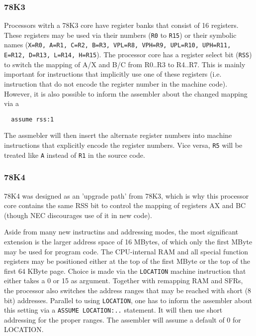 \documentclass[12pt,twoside]{report}
\newcommand{\tty}[1]{{\tt #1}}
\begin{document}

\subsubsection{78K3}

Processors witrh a 78K3 core have register banks that consist of
16 registers.  These registers may be used via their numbers
(\tty{R0} to \tty{R15}) or their symbolic names (\tty{X=R0, A=R1,
C=R2, B=R3, VPL=R8, VPH=R9, UPL=R10, UPH=R11, E=R12,
D=R13, L=R14, H=R15}).  The processor core has a register select
bit (\tty{RSS}) to switch the mapping of A/X and B/C from R0..R3
to R4..R7.  This is mainly important for instructions that
implicitly use one of these registers (i.e. instruction that do
not encode the register number in the machine code).  However, it
is also possible to inform the assembler about the changed
mapping via a

\begin{verbatim}
  assume rss:1
\end{verbatim}

The assmebler will then insert the alternate register numbers
into machine instructions that explicitly encode the register
numbers.  Vice versa, \tty{R5} will be treated like \tty{A} instead
of \tty{R1} in the source code.


\subsubsection{78K4}

78K4 was designed as an 'upgrade path' from 78K3, which is why
this processor core contains the same RSS bit to control the
mapping of registers AX and BC (though NEC discourages use of it
in new code).

Aside from many new instructins and addressing modes, the most
significant extension is the larger address space of 16 MBytes,
of which only the first MByte may be used for program code.  The
CPU-internal RAM and all special function registers may be
positioned either at the top of the first MByte or the top of the
first 64 KByte page.  Choice is made via the \tty{LOCATION}
machine instruction that either takes a 0 or 15 as argument. 
Together with remapping RAM and SFRs, the processor also switches
the address ranges that may be reached with short (8 bit)
addresses.  Parallel to using \tty{LOCATION}, one has to inform
the assembler about this setting via a \tty{ASSUME LOCATION:..}
statement.  It will then use short addressing for the proper
ranges.  The assembler will assume a default of 0 for LOCATION.
\end{document}
